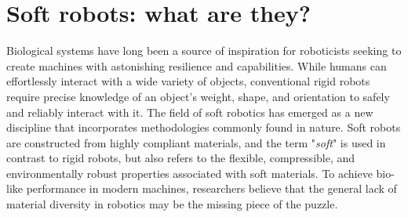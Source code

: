 \section{Soft robots: what are they?}
\label{sec:intro:history}
Biological systems have long been a source of inspiration for roboticists seeking to create machines with astonishing resilience and capabilities. While humans can effortlessly interact with a wide variety of objects, conventional rigid robots require precise knowledge of an object's weight, shape, and orientation to safely and reliably interact with it. The field of soft robotics has emerged as a new discipline that incorporates methodologies commonly found in nature. Soft robots are constructed from highly compliant materials, and the term "\emph{soft}" is used in contrast to rigid robots, but also refers to the flexible, compressible, and environmentally robust properties associated with soft materials. To achieve bio-like performance in modern machines, researchers believe that the general lack of material diversity in robotics may be the missing piece of the puzzle.

